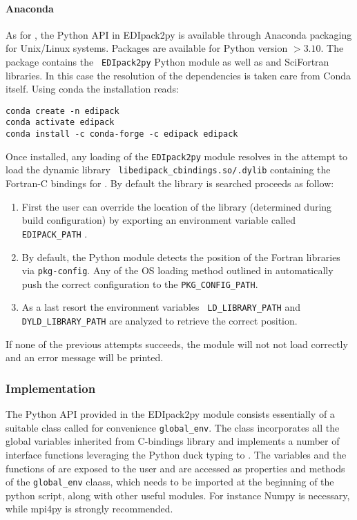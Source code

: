 \documentclass[edipack2.tex]{subfiles}
\begin{document}
\paragraph{Anaconda}
As for \NAME, the Python API in EDIpack2py is available through
Anaconda packaging for Unix/Linux systems. Packages are available for
Python version $>3.10$. The \NAME package contains the {\tt
  EDIpack2py} Python module as well as \NAME and SciFortran
libraries. In this case the resolution of the dependencies is
taken care from Conda itself. 
Using conda the installation reads:
\begin{lstlisting}[style=mybash]
conda create -n edipack
conda activate edipack
conda install -c conda-forge -c edipack edipack
\end{lstlisting}


Once installed, any loading of the {\tt EDIpack2py} module resolves in the
attempt to load the dynamic library {\tt
  libedipack\_cbindings.so/.dylib} containing the Fortran-C bindings
for \NAME. By default the library is searched proceeds as follow: 
\begin{enumerate}
\item First the user can override the location of the library
  (determined during \NAME build configuration) by exporting an
  environment variable called {\tt EDIPACK\_PATH} .
\item By default, the Python module detects the position of the
  Fortran libraries via {\tt pkg-config}. Any of the OS loading method
  outlined in  automatically push the
  correct configuration to the {\tt PKG\_CONFIG\_PATH}. 
\item As a last resort the environment variables {\tt
    LD\_LIBRARY\_PATH} and {\tt DYLD\_LIBRARY\_PATH} are analyzed to
  retrieve the correct position. 
\end{enumerate}
If none of the previous attempts succeeds, the module will not not load correctly and an error message will be printed. 



\subsubsection{Implementation}\label{sSecInteropEDIpyImplementation}
The Python API provided in the EDIpack2py module consists essentially of a
suitable class called for convenience {\tt global\_env}.
The class incorporates all the global variables inherited from \NAME
C-bindings library and implements a number of interface functions
leveraging the Python duck typing to \NAME.  
The variables and the functions of \NAME are exposed to the user and
are accessed as properties and
methods of the {\tt global\_env} claass, which needs to be imported at the beginning
of the python script, along with other useful modules. For instance Numpy is
necessary, while mpi4py is strongly recommended.
\end{document}
